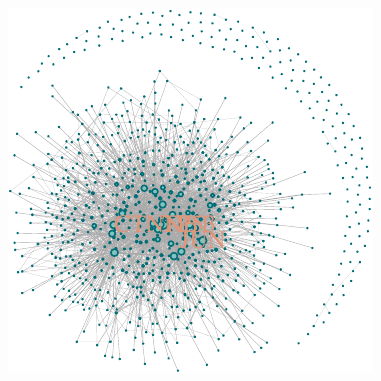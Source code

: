 \documentclass[
]{book}
\begin{document}
\includegraphics{NetMed_files/figure-latex/unnamed-chunk-24-1.pdf}
\end{document}
